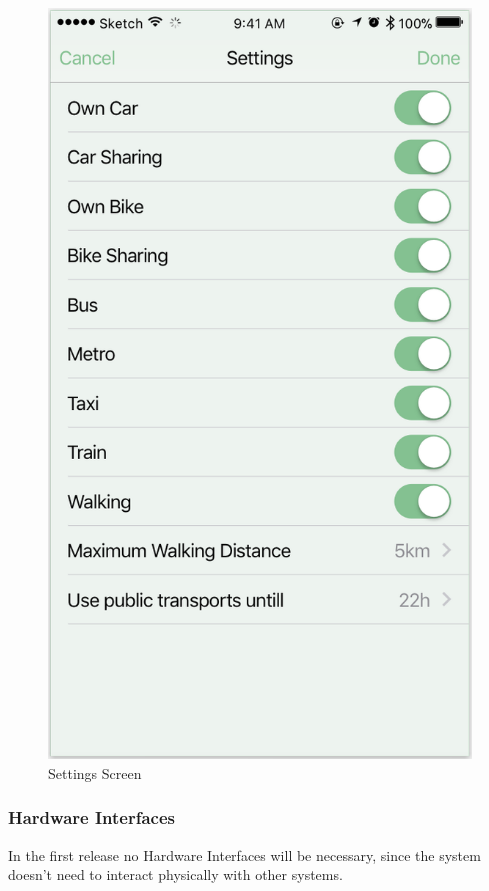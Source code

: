 \documentclass[12pt]{article}
\begin{document}
\begin{figure}[H]
\centering
    \includegraphics[scale=0.5]{interfaceSettings.png}
    \caption{Settings Screen}
\label{fig:settingsScreen}
\end{figure}


\subsubsection{Hardware Interfaces}
In the first release no Hardware Interfaces will be necessary, since the system doesn't need to interact physically with other systems.
\end{document}
